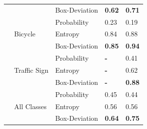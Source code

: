 \begin{table}[H]
\begin{tabular}{lllll}
                                     &                               & Box-Deviation & \textbf{0.62}              & \textbf{0.71}                                                           \\ \cline{2-5} 
                                     & \multirow{3}{*}{Bicycle}      & Probability   & 0.23              & 0.19                                                           \\ \cline{3-5} 
                                     &                               & Entropy       & 0.84              & 0.88                                                           \\ \cline{3-5} 
                                     &                               & Box-Deviation & \textbf{0.85}              & \textbf{0.94}                                                           \\ \cline{2-5} 
                                     & \multirow{3}{*}{Traffic Sign} & Probability   & \textbf{-}        & 0.41                                                           \\ \cline{3-5} 
                                     &                               & Entropy       & \textbf{-}        & 0.62                                                           \\ \cline{3-5} 
                                     &                               & Box-Deviation & \textbf{-}        & \textbf{0.88}                                                           \\ \cline{2-5} 
                                     & \multirow{3}{*}{All Classes}  & Probability   & 0.45              & 0.44                                                           \\ \cline{3-5} 
                                     &                               & Entropy       & 0.56              & 0.56                                                           \\ \cline{3-5} 
                                     &                               & Box-Deviation & \textbf{0.64}              & \textbf{0.75}                                                           \\ \hline
        \end{tabular}
    \end{table}
    
